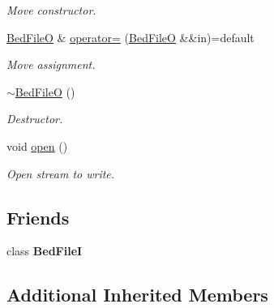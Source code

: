 \begin{DoxyCompactItemize}
\begin{DoxyCompactList}\small\item\em Move constructor. \end{DoxyCompactList}\item 
\mbox{\label{classvarfiles_1_1_bed_file_o_ad1ab09d90f0f005709717b8e6cd84d94}} 
\hyperlink{classvarfiles_1_1_bed_file_o}{Bed\+FileO} \& \hyperlink{classvarfiles_1_1_bed_file_o_ad1ab09d90f0f005709717b8e6cd84d94}{operator=} (\hyperlink{classvarfiles_1_1_bed_file_o}{Bed\+FileO} \&\&in)=default
\begin{DoxyCompactList}\small\item\em Move assignment. \end{DoxyCompactList}\item 
\mbox{\label{classvarfiles_1_1_bed_file_o_ae4b5539e5df7e4c4c6403e054b30ca2b}} 
\hyperlink{classvarfiles_1_1_bed_file_o_ae4b5539e5df7e4c4c6403e054b30ca2b}{$\sim$\+Bed\+FileO} ()
\begin{DoxyCompactList}\small\item\em Destructor. \end{DoxyCompactList}\item 
\mbox{\label{classvarfiles_1_1_bed_file_o_a70bee4622ebf338c6f17859f2409d17c}} 
void \hyperlink{classvarfiles_1_1_bed_file_o_a70bee4622ebf338c6f17859f2409d17c}{open} ()
\begin{DoxyCompactList}\small\item\em Open stream to write. \end{DoxyCompactList}\end{DoxyCompactItemize}
\subsection*{Friends}
\begin{DoxyCompactItemize}
\item 
\mbox{\label{classvarfiles_1_1_bed_file_o_a83903ab2cdc6179910bbb04232c007ea}} 
class {\bfseries Bed\+FileI}
\end{DoxyCompactItemize}
\subsection*{Additional Inherited Members}


